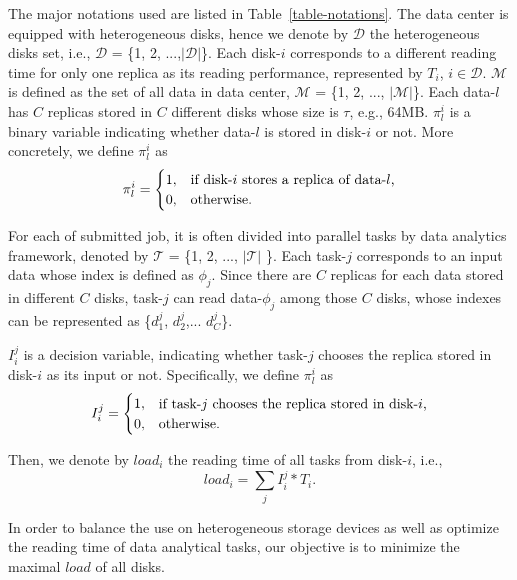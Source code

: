 \documentclass[conference]{IEEEtran}
\makeatletter
\newcommand{\tabincell}[2]{\begin{tabular}{@{}#1@{}}#2\end{tabular}}
\makeatother
\begin{document}
The major notations used are listed in Table~\ref{table-notations}. The data center is equipped with heterogeneous disks, hence we denote by $\mathcal{D}$ the heterogeneous disks set, i.e., $\mathcal{D}$ = \{1, 2, ...,$|\mathcal{D}|$\}. Each disk-$i$ corresponds to a different reading time for only one replica as its reading performance, represented by $T_i$, $i \in \mathcal{D}$.
$\mathcal{M}$ is defined as the set of all data in data center, $\mathcal{M}$ = \{1, 2, ..., $|\mathcal{M}|$\}. Each data-$l$ has $C$ replicas stored in $C$ different disks whose size is $\tau$, e.g., 64MB. $\pi_l^{i}$ is a binary variable indicating whether data-$l$ is stored in disk-$i$ or not. More concretely, we define $\pi_l^{i}$ as
\begin{equation}
\pi_l^{i} =
\begin{cases}
1, &\text{if disk-$i$ stores a replica of data-$l$,}\\
0, &\text{otherwise.}
\end{cases}\nonumber
\vspace{-0.2cm}
\end{equation}

For each of submitted job, it is often divided into parallel tasks by data analytics framework, denoted by $\mathcal{T}$ = \{1, 2,  ..., $\mathcal{|T|}$ \}. Each task-$j$ corresponds to an input data whose index is defined as $\phi_j$. Since there are $C$ replicas for each data stored in different $C$ disks, task-$j$ can read data-$\phi_j$ among those $C$ disks, whose indexes can be represented as \{$d_{1}^j$, $d_{2}^j$,... $d_{C}^j$\}.


$I_i^j$ is a decision variable, indicating whether task-$j$ chooses the replica stored in disk-$i$ as its input or not. Specifically, we define $\pi_l^{i}$ as
\begin{equation}
I_i^j =
\begin{cases}
1, &\text{\tabincell{l}{if task-$j$ chooses the replica stored in disk-$i$,}}\\
0, &\text{otherwise.}
\end{cases}\nonumber
\end{equation}

Then, we denote by $load_i$ the reading time of all tasks from disk-$i$, i.e.,
\begin{equation}
 load_{i} = \sum_{j}I_i^j*T_i. \nonumber
\end{equation}
 
 \vspace{-0.2cm}
 In order to balance the use on heterogeneous storage devices as well as optimize the reading time of data analytical tasks, our objective is to minimize the maximal $load$ of all disks.
\end{document}
